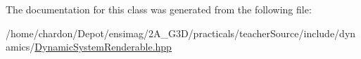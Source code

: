 The documentation for this class was generated from the following file\+:\begin{DoxyCompactItemize}
\item 
/home/chardon/\+Depot/ensimag/2\+A\+\_\+\+G3\+D/practicals/teacher\+Source/include/dynamics/\hyperlink{DynamicSystemRenderable_8hpp}{Dynamic\+System\+Renderable.\+hpp}\end{DoxyCompactItemize}
